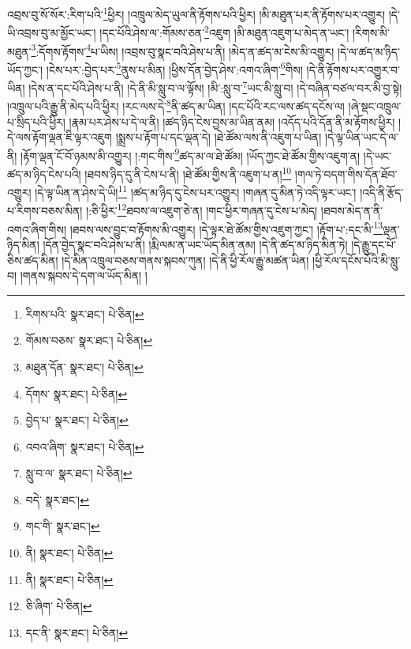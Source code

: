 འབྲས་བུ་སོ་སོར་:རིག་པའི་\footnote{རིགས་པའི་  སྣར་ཐང་།  པེ་ཅིན། }ཕྱིར། །འཁྲུལ་མེད་ཡུལ་ནི་རྟོགས་པའི་ཕྱིར། །མི་མཐུན་པར་ནི་རྟོགས་པར་འགྱུར། །དེ་ཡི་འབྲས་བུ་མ་མྱོང་ཡང་། །དང་པོའི་ཤེས་ལ་:གོམས་ཅན་\footnote{གོམས་བཅས་  སྣར་ཐང་།  པེ་ཅིན། }འཇུག །མི་མཐུན་འཇུག་པ་མེད་ན་ཡང་། །རིགས་མི་མཐུན་\footnote{མཐུན་དོན་  སྣར་ཐང་།  པེ་ཅིན། }:དོགས་རྟོགས་\footnote{དོགས་  སྣར་ཐང་།  པེ་ཅིན། }པ་ཡིས། །འབྲས་བུ་སྣང་བའི་ཤེས་པ་ནི། །མེད་ན་ཚད་མ་ངེས་མི་འགྱུར། །དེ་ལ་ཚད་མ་ཉིད་ཡོད་ཀྱང་། །ངེས་པར་:བྱེད་པར་\footnote{བྱེད་པ་  སྣར་ཐང་།  པེ་ཅིན། }ནུས་པ་མིན། །ཕྱིས་དོན་བྱེད་ཤེས་:འགའ་ཞིག་\footnote{འབའ་ཞིག་  སྣར་ཐང་།  པེ་ཅིན། }གིས། །དེ་ནི་རྟོགས་པར་འགྱུར་བ་ཡིན། །དེས་ན་དང་པོའི་ཤེས་པ་ནི། །དེ་ནི་མི་སླུ་བ་ལ་ལྟོས། །མི་:སླུ་བ་\footnote{སླུ་བ་ལ་  སྣར་ཐང་།  པེ་ཅིན། }ཡང་མི་སླུ་བ། །དེ་བཞིན་བཙལ་བར་མི་བྱ་སྟེ། །འཁྲུལ་པའི་རྒྱུ་ནི་མེད་པའི་ཕྱིར། །རང་ལས་དེ་\footnote{བདེ་  སྣར་ཐང་། }ནི་ཚད་མ་ཡིན། །དང་པོའི་རང་ལས་ཚད་དངོས་ལ། །ཞེ་སྡང་འཁྲུལ་པ་སྲིད་པའི་ཕྱིར། །རྣམ་པར་ཤེས་པ་དེ་ལ་ནི། །ཚད་ཉིད་ངེས་བྱས་མ་ཡིན་ནམ། །འདོད་པའི་དོན་ནི་མ་རྟོགས་ཕྱིར། །དེ་ལས་རྟོག་ལྡན་ཇི་ལྟར་འཇུག །སྨྲས་པ་རྟོག་པ་དང་ལྡན་དེ། །ཐེ་ཚོམ་ལས་ནི་འཇུག་པ་ཡིན། །དེ་ལྟ་ཡིན་ཡང་དེ་ལ་ནི། །རྟོག་ལྡན་ངོ་བོ་ཉམས་མི་འགྱུར། །:གང་གིས་\footnote{གང་གི་  སྣར་ཐང་། }ཚད་མ་ལ་ཐེ་ཚོམ། །ཡོད་ཀྱང་ཐེ་ཚོམ་གྱིས་འཇུག་ན། །དེ་ཡང་ཚད་མ་ཉིད་ངེས་པའི། །ཐབས་ཉིད་དུ་ནི་ངེས་པ་ནི། །ཐེ་ཚོམ་གྱིས་ནི་འཇུག་པ་ན།\footnote{ནི།  སྣར་ཐང་།  པེ་ཅིན། } །གལ་ཏེ་བདག་གིས་དོན་ཐོབ་འགྱུར། །དེ་ལྟ་ཡིན་ན་ཤེས་དེ་ཡི།\footnote{ནི།  སྣར་ཐང་།  པེ་ཅིན། } །ཚད་མ་ཉིད་དུ་ངེས་པར་འགྱུར། །གཞན་དུ་མིན་ཏེ་འདི་ལྟར་ཡང་། །འདི་ནི་རྩོད་པ་རིགས་བཅས་མིན། །:ཅི་ཕྱིར་\footnote{ཅི་ཞིག་  པེ་ཅིན། }ཐབས་ལ་འཇུག་ཅེ་ན། །གང་ཕྱིར་གཞན་དུ་ངེས་པ་མེད། །ཐབས་མེད་ན་ནི་འགའ་ཞིག་གིས། །ཐབས་ལས་བྱུང་བ་རྟོགས་མི་འགྱུར། །དེ་ལྟར་ཐེ་ཚོམ་གྱིས་འཇུག་ཀྱང་། །རྟོག་པ་:དང་མི་\footnote{དང་ནི་  སྣར་ཐང་།  པེ་ཅིན། }ལྡན་ཉིད་མིན། །དོན་བྱེད་སྣང་བའི་ཤེས་པ་ནི། །རྨི་ལམ་ན་ཡང་ཡོད་མིན་ནམ། །དེ་ནི་ཚད་མ་ཉིད་མིན་ཏེ། །དེ་རྒྱུ་དང་པོ་ཅིས་ཚད་མིན། །དེ་མིན་འཁྲུལ་བཅས་གནས་སྐབས་ཀུན། །དེ་ནི་ཕྱི་རོལ་རྒྱུ་མཚན་ཡིན། །ཕྱི་རོལ་དངོས་པོའི་མི་སླུ་བ། །གནས་སྐབས་དེ་དག་ལ་ཡོད་མིན། །
